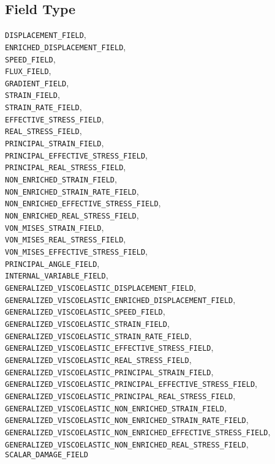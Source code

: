 \documentclass[10pt]{article}
\begin{document}
\subsection{Field Type}

    \verb+DISPLACEMENT_FIELD+,\\
    \verb+ENRICHED_DISPLACEMENT_FIELD+,\\
    \verb+SPEED_FIELD+,\\
    \verb+FLUX_FIELD+,\\
    \verb+GRADIENT_FIELD+,\\
    \verb+STRAIN_FIELD+,\\
    \verb+STRAIN_RATE_FIELD+,\\
    \verb+EFFECTIVE_STRESS_FIELD+,\\
    \verb+REAL_STRESS_FIELD+,\\
    \verb+PRINCIPAL_STRAIN_FIELD+,\\
    \verb+PRINCIPAL_EFFECTIVE_STRESS_FIELD+,\\
    \verb+PRINCIPAL_REAL_STRESS_FIELD+,\\
    \verb+NON_ENRICHED_STRAIN_FIELD+,\\
    \verb+NON_ENRICHED_STRAIN_RATE_FIELD+,\\
    \verb+NON_ENRICHED_EFFECTIVE_STRESS_FIELD+,\\
    \verb+NON_ENRICHED_REAL_STRESS_FIELD+,\\
    \verb+VON_MISES_STRAIN_FIELD+,\\
    \verb+VON_MISES_REAL_STRESS_FIELD+,\\
    \verb+VON_MISES_EFFECTIVE_STRESS_FIELD+,\\
    \verb+PRINCIPAL_ANGLE_FIELD+,\\
    \verb+INTERNAL_VARIABLE_FIELD+,\\
    \verb+GENERALIZED_VISCOELASTIC_DISPLACEMENT_FIELD+,\\
    \verb+GENERALIZED_VISCOELASTIC_ENRICHED_DISPLACEMENT_FIELD+,\\
    \verb+GENERALIZED_VISCOELASTIC_SPEED_FIELD+,\\
    \verb+GENERALIZED_VISCOELASTIC_STRAIN_FIELD+,\\
    \verb+GENERALIZED_VISCOELASTIC_STRAIN_RATE_FIELD+,\\
    \verb+GENERALIZED_VISCOELASTIC_EFFECTIVE_STRESS_FIELD+,\\
    \verb+GENERALIZED_VISCOELASTIC_REAL_STRESS_FIELD+,\\
    \verb+GENERALIZED_VISCOELASTIC_PRINCIPAL_STRAIN_FIELD+,\\
    \verb+GENERALIZED_VISCOELASTIC_PRINCIPAL_EFFECTIVE_STRESS_FIELD+,\\
    \verb+GENERALIZED_VISCOELASTIC_PRINCIPAL_REAL_STRESS_FIELD+,\\
    \verb+GENERALIZED_VISCOELASTIC_NON_ENRICHED_STRAIN_FIELD+,\\
    \verb+GENERALIZED_VISCOELASTIC_NON_ENRICHED_STRAIN_RATE_FIELD+,\\
    \verb+GENERALIZED_VISCOELASTIC_NON_ENRICHED_EFFECTIVE_STRESS_FIELD+,\\
    \verb+GENERALIZED_VISCOELASTIC_NON_ENRICHED_REAL_STRESS_FIELD+,\\
    \verb+SCALAR_DAMAGE_FIELD+
\end{document}
